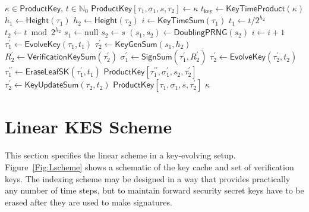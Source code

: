 \documentclass{article}
\begin{document}
\begin{algorithm}
\caption{$\mathsf{KeyUpdateProduct}:\kappa , t \to \mathsf{\hyperref[def:ProductKey]{ProductKey}}  $}\label{alg:KeyUpdateProduct}
\begin{algorithmic}[1]
\Require $\kappa \in \mathsf{\hyperref[def:ProductKey]{ProductKey}}$, $t\in \mathbb{N}_0$
\State $\mathsf{\hyperref[def:ProductKey]{ProductKey}}[\tau_1,\sigma_1,s,\tau_2]\gets \kappa$
\State $t_\mathrm{key} \gets \mathsf{\hyperref[alg:KeyTimeProduct]{KeyTimeProduct}}(\kappa)$
\State $h_1\gets \mathsf{\hyperref[alg:Height]{Height}}(\tau_1)$
\State $h_2\gets \mathsf{\hyperref[alg:Height]{Height}}(\tau_2)$
    \State $i \gets \mathsf{\hyperref[alg:KeyTimeSum]{KeyTimeSum}}(\tau_1)$
    \State $t_1 \gets t / 2^{h_2}$
    \State $t_2 \gets t \bmod 2^{h_2}$
        \State $s_1 \gets \mathrm{null}$
        \State $s_2 \gets s$
            \State $(s_1,s_2) \gets \mathsf{\hyperref[alg:DoublingPRNG]{DoublingPRNG}}(s_2)$
            \State $i \gets i + 1 $
        \EndWhile
        \State $\tau^\prime_1\gets\mathsf{\hyperref[alg:EvolveKey]{EvolveKey}}(\tau_1,t_1)$
        \State $\tau^\prime_2 \gets \mathsf{\hyperref[alg:KeyGenSum]{KeyGenSum}}(s_1,h_2)$
        \State $R_2^\prime\gets \mathsf{\hyperref[alg:VerificationKeySum]{VerificationKeySum}}(\tau^\prime_2)$
        \State $\sigma_1^\prime \gets \mathsf{\hyperref[alg:SignSum]{SignSum}}(\tau^\prime_1,R_2^\prime)$
        \State $\tau^\prime_2\gets\mathsf{\hyperref[alg:EvolveKey]{EvolveKey}}(\tau^\prime_2,t_2)$
        \State $\tau_1^{\prime\prime} \gets \mathsf{\hyperref[alg:EraseLeafSK]{EraseLeafSK}}(\tau^\prime_1,t_1)$
        \State \Return $\mathsf{\hyperref[def:ProductKey]{ProductKey}}[\tau^{\prime\prime}_1,\sigma_1^\prime,s_2,\tau^\prime_2]$
    \Else
        \State $\tau^\prime_2\gets\mathsf{\hyperref[alg:KeyUpdateSum]{KeyUpdateSum}}(\tau_2,t_2)$
        \State \Return $\mathsf{\hyperref[def:ProductKey]{ProductKey}}[\tau_1,\sigma_1,s,\tau^\prime_2]$
    \EndIf
\Else
    \State \Return $\kappa$
\EndIf
\end{algorithmic}
\end{algorithm}


\newpage
\section{Linear KES Scheme}

This section specifies the linear scheme in a key-evolving setup.  
Figure~\ref{Fig:Lscheme} shows a schematic of the key cache and set of verification keys.
The indexing scheme may be designed in a way that provides practically any number of time steps, but to maintain forward security secret keys have to be erased after they are used to make signatures. 
\end{document}
